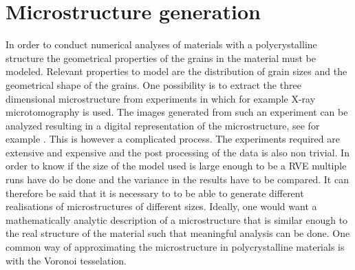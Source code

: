 \documentclass[micro_gen.tex]{subfiles}
\begin{document}
\chapter{Microstructure generation}

In order to conduct numerical analyses of materials with a polycrystalline structure the geometrical properties of the grains in the material must be modeled. Relevant properties to model are the distribution of grain sizes and the geometrical shape of the grains.
One possibility is to extract the three dimensional microstructure from experiments in which for example X-ray microtomography is used. 
The images generated from such an experiment can be analyzed resulting in a digital representation of the microstructure, see for example \cite{Bhandari2007222}.
 This is however a complicated process. The experiments required are extensive and expensive and the post processing of the data is also non trivial. 
 In order to know if the size of the model used is large enough to be a RVE multiple runs have do be done and the variance in the results have to be compared. It can therefore be said that it is necessary to to be able to generate different realisations of microstructures of different sizes. Ideally, one would want a mathematically analytic description of a microstructure that is similar enough to the real structure of the material such that meaningful analysis can be done. One common way of approximating the microstructure in polycrystalline materials is with the Voronoi tesselation. 
 
\end{document}
